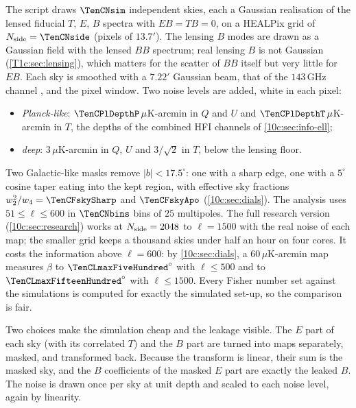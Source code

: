The script  draws $\TenCNsim$ independent skies, each a Gaussian realisation of
the lensed fiducial $T$, $E$, $B$ spectra with $EB=TB=0$, on a HEALPix grid of $N_{\rm side}=\TenCNside$ (pixels of
$13.7'$). The lensing $B$ modes are drawn as a Gaussian field with the lensed $BB$ spectrum; real lensing $B$ is not
Gaussian (\cref{T1c:sec:lensing}), which matters for the scatter of $BB$ itself but very little for $EB$. Each sky is
smoothed with a $7.22'$ Gaussian beam, that of the $143\,$GHz channel \cite{Planck2018I}, and the pixel window. Two noise levels are added, white in each pixel:
\begin{itemize}[leftmargin=1.4em,itemsep=1pt]
  \item \emph{Planck-like}: $\TenCPlDepthP\,\mu$K-arcmin in $Q$ and $U$ and $\TenCPlDepthT\,\mu$K-arcmin in $T$, the depths of the
        combined HFI channels of \cref{10c:sec:info-ell};
  \item \emph{deep}: $3\,\mu$K-arcmin in $Q$, $U$ and $3/\sqrt2$ in $T$, below the lensing floor.
\end{itemize}
Two Galactic-like masks remove $|b|<17.5^\circ$: one with a sharp edge, one with a $5^\circ$ cosine taper eating into
the kept region, with effective sky fractions $w_2^2/w_4=\TenCFskySharp$ and $\TenCFskyApo$
(\cref{10c:sec:dials}). The analysis uses $51\le\ell\le600$ in $\TenCNbins$ bins of $25$ multipoles. The full research
version (\cref{10c:sec:research}) works at $N_{\rm side}=2048$ to $\ell=1500$ with the real noise of each map; the
smaller grid keeps a thousand skies under half an hour on four cores. It costs the information above $\ell=600$:
by \cref{10c:sec:dials}, a $60\,\mu$K-arcmin map measures $\beta$ to ${\TenCLmaxFiveHundred}^\circ$ with $\ell\le500$ and to
${\TenCLmaxFifteenHundred}^\circ$ with $\ell\le1500$. Every Fisher number set against the simulations is computed for exactly the simulated
set-up, so the comparison is fair.

Two choices make the simulation cheap and the leakage visible. The $E$ part of each sky (with its correlated $T$)
and the $B$ part are turned into maps separately, masked, and transformed back. Because the transform is linear,
their sum is the masked sky, and the $B$ coefficients of the masked $E$ part are exactly the leaked $B$. The noise
is drawn once per sky at unit depth and scaled to each noise level, again by linearity.

